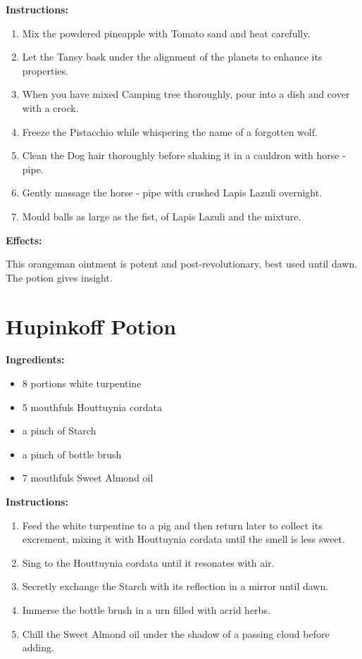 \documentclass{article}
\begin{document}
\textbf{Instructions:}

\begin{enumerate}
  \item Mix the powdered pineapple with Tomato sand and heat carefully.
  \item Let the Tansy bask under the alignment of the planets to enhance its properties.
  \item When you have mixed Camping tree thoroughly, pour into a dish and cover with a crock.
  \item Freeze the Pistacchio while whispering the name of a forgotten wolf.
  \item Clean the Dog hair thoroughly before shaking it in a cauldron with horse - pipe.
  \item Gently massage the horse - pipe with crushed Lapis Lazuli overnight.
  \item Mould balls as large as the fist, of Lapis Lazuli and the mixture.
\end{enumerate}

\textbf{Effects:}

This orangeman ointment is potent and post-revolutionary, best used until dawn. The potion gives insight.

\newpage
\section*{Hupinkoff Potion}

\textbf{Ingredients:}

\begin{itemize}
  \item 8 portions white turpentine
  \item 5 mouthfuls Houttuynia cordata
  \item a pinch of Starch
  \item a pinch of bottle brush
  \item 7 mouthfuls Sweet Almond oil
\end{itemize}

\textbf{Instructions:}

\begin{enumerate}
  \item Feed the white turpentine to a pig and then return later to collect its excrement, mixing it with Houttuynia cordata until the smell is less sweet.
  \item Sing to the Houttuynia cordata until it resonates with air.
  \item Secretly exchange the Starch with its reflection in a mirror until dawn.
  \item Immerse the bottle brush in a urn filled with acrid herbs.
  \item Chill the Sweet Almond oil under the shadow of a passing cloud before adding.
\end{enumerate}
\end{document}
